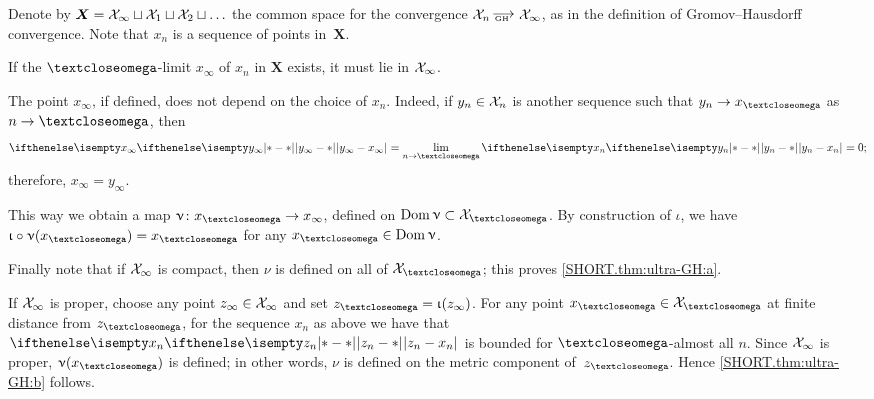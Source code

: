 Denote by $\bm{X}=\spc{X}_\infty\sqcup\spc{X}_1\sqcup\spc{X}_2\sqcup\dots$ the common space for the convergence $\spc{X}_n\GHto \spc{X}_\infty$,
as in the definition of Gromov--Hausdorff convergence.
Note that $x_n$ is a sequence of points in~$\bm{X}$.

If the $\o$-limit $x_\infty$ of $x_n$ in $\bm{X}$ exists, 
it must lie in $\mathcal{X}_\infty$. 

The point $x_\infty$, if defined, does not depend on the choice of $x_n$.
Indeed, if $y_n\in\spc{X}_n$ is another sequence such that $y_n\to x_\o$ as $n\to\o$, then 
\[
\dist{y_\infty}{x_\infty}{}=\lim_{n\to\o}\dist{y_n}{x_n}{}=0;
\]
therefore, $x_\infty=y_\infty$.


This way we obtain a map $\nu\:x_\o\to x_\infty$, defined on  $\Dom\nu \subset\spc{X}_\o$.
By construction of $\iota$, 
we have $\iota\circ\nu(x_\o)=x_\o$ for any $x_\o\in \Dom\nu$.

Finally note that if $\mathcal{X}_\infty$ is compact, then $\nu$ is defined on all of $\spc{X}_\o$;
this proves \ref{SHORT.thm:ultra-GH:a}.

If $\mathcal{X}_\infty$ is proper, choose any point $z_\infty\in \spc{X}_\infty$
and set $z_\o=\iota(z_\infty)$.
For any point $x_\o\in \spc{X}_\o$ at finite distance from $z_\o$,
for the sequence $x_n$ 
as above we have that $\dist{z_n}{x_n}{}$ is bounded for $\o$-almost all $n$.
Since $\mathcal{X}_\infty$ is proper, $\nu(x_\o)$ is defined;
in other words, $\nu$ is defined on the metric component of~$z_\o$.
Hence \ref{SHORT.thm:ultra-GH:b} follows.
\qeds




